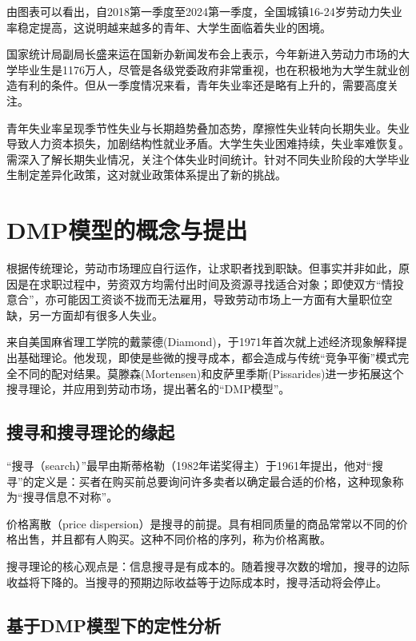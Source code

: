 
由图表可以看出，自2018第一季度至2024第一季度，全国城镇16-24岁劳动力失业率稳定提高，这说明越来越多的青年、大学生面临着失业的困境。

国家统计局副局长盛来运在国新办新闻发布会上表示，今年新进入劳动力市场的大学毕业生是1176万人，尽管是各级党委政府非常重视，也在积极地为大学生就业创造有利的条件。但从一季度情况来看，青年失业率还是略有上升的，需要高度关注。

青年失业率呈现季节性失业与长期趋势叠加态势，摩擦性失业转向长期失业。失业导致人力资本损失，加剧结构性就业矛盾。大学生失业困难持续，失业率难恢复。需深入了解长期失业情况，关注个体失业时间统计。针对不同失业阶段的大学毕业生制定差异化政策，这对就业政策体系提出了新的挑战。

\section{DMP模型的概念与提出}

根据传统理论，劳动市场理应自行运作，让求职者找到职缺。但事实并非如此，原因是在求职过程中，劳资双方均需付出时间及资源寻找适合对象；即使双方“情投意合”，亦可能因工资谈不拢而无法雇用，导致劳动市场上一方面有大量职位空缺，另一方面却有很多人失业。

来自美国麻省理工学院的戴蒙德(Diamond)，于1971年首次就上述经济现象解释提出基础理论。他发现，即使是些微的搜寻成本，都会造成与传统“竞争平衡”模式完全不同的配对结果。莫滕森(Mortensen)和皮萨里季斯(Pissarides)进一步拓展这个搜寻理论，并应用到劳动市场，提出著名的“DMP模型”。

\subsection{搜寻和搜寻理论的缘起}

“搜寻（search）”最早由斯蒂格勒（1982年诺奖得主）于1961年提出，他对“搜寻”的定义是：买者在购买前总要询问许多卖者以确定最合适的价格，这种现象称为“搜寻信息不对称”。

价格离散（price dispersion）是搜寻的前提。具有相同质量的商品常常以不同的价格出售，并且都有人购买。这种不同价格的序列，称为价格离散。

搜寻理论的核心观点是：信息搜寻是有成本的。随着搜寻次数的增加，搜寻的边际收益将下降的。当搜寻的预期边际收益等于边际成本时，搜寻活动将会停止。

\subsection{基于DMP模型下的定性分析}

